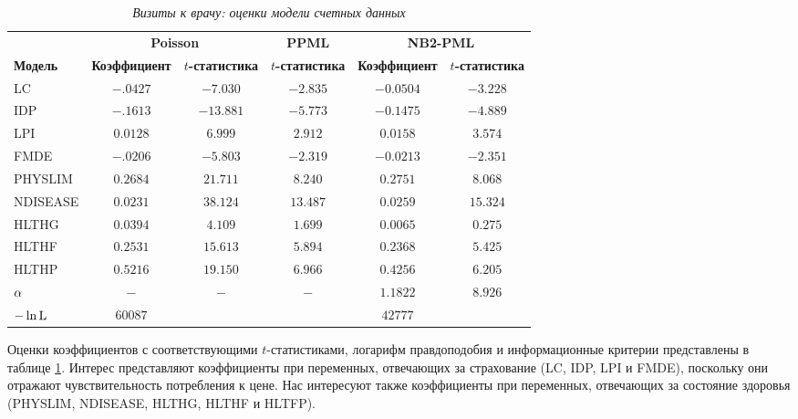     \begin{table}[!htbp]\caption{\textit{Визиты к врачу: оценки модели счетных данных}}\label{tab:20.5}
    \begin{center}
\begin{tabular}{lccccc}
\hline \hline
&\multicolumn{2}{c}{\textbf{Poisson}}&\textbf{PPML}&\multicolumn{2}{c}{\textbf{NB2-PML}}\\
\cmidrule(r){2-3}\cmidrule(r){4-4}\cmidrule(r){5-6}
\textbf{Модель}&\textbf{Коэффициент}&\textbf{$t$-статистика}&\textbf{$t$-статистика}&\textbf{Коэффициент}&\textbf{$t$-статистика}\\
\hline
LC      &$-.0427$&$-7.030$  &$-2.835$   &$-0.0504$  &$-3.228$\\
IDP     &$-.1613$&$-13.881$ &$-5.773$   &$-0.1475$  &$-4.889$\\
LPI     &$0.0128$&$6.999$   &$2.912$    &$0.0158$   &$3.574$\\
FMDE    &$-.0206$&$-5.803$  &$-2.319$   &$-0.0213$  &$-2.351$\\
PHYSLIM &$0.2684$&$21.711$  &$8.240$    &$0.2751$   &$8.068$\\
NDISEASE&$0.0231$&$38.124$  &$13.487$   &$0.0259$   &$15.324$\\
HLTHG   &$0.0394$&$4.109$   &$1.699$    &$0.0065$   &$0.275$\\
HLTHF   &$0.2531$&$15.613$  &$5.894$    &$0.2368$   &$5.425$\\
HLTHP   &$0.5216$&$19.150$  &$6.966$    &$0.4256$   &$6.205$\\
$\alpha$   &$-$     &$-$       &$-$        &$1.1822$   &$8.926$\\
$-\ln\mathrm{L}$&$60087$ &          &           &$42777$    &\\
\hline \hline
\end{tabular}
    \end{center}
    \end{table}

Оценки коэффициентов с соответствующими $t$-статистиками, логарифм правдоподобия и информационные критерии представлены в таблице \ref{tab:20.5}. Интерес представляют коэффициенты при переменных, отвечающих за страхование (LC, IDP, LPI и FMDE), поскольку они отражают чувствительность потребления к цене. Нас интересуют также коэффициенты при переменных, отвечающих за состояние здоровья (PHYSLIM, NDISEASE, HLTHG, HLTHF и HLTFP).

